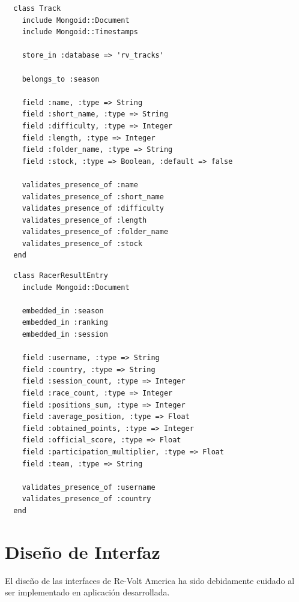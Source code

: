 \begin{listing}
  \begin{verbatim}
  class Track
    include Mongoid::Document
    include Mongoid::Timestamps
    
    store_in :database => 'rv_tracks'
    
    belongs_to :season
    
    field :name, :type => String
    field :short_name, :type => String
    field :difficulty, :type => Integer
    field :length, :type => Integer
    field :folder_name, :type => String
    field :stock, :type => Boolean, :default => false
    
    validates_presence_of :name
    validates_presence_of :short_name
    validates_presence_of :difficulty
    validates_presence_of :length
    validates_presence_of :folder_name
    validates_presence_of :stock
  end
  \end{verbatim}
\end{listing}

\begin{listing}
  \begin{verbatim}
  class RacerResultEntry
    include Mongoid::Document
    
    embedded_in :season
    embedded_in :ranking
    embedded_in :session
    
    field :username, :type => String
    field :country, :type => String
    field :session_count, :type => Integer
    field :race_count, :type => Integer
    field :positions_sum, :type => Integer
    field :average_position, :type => Float
    field :obtained_points, :type => Integer
    field :official_score, :type => Float
    field :participation_multiplier, :type => Float
    field :team, :type => String
    
    validates_presence_of :username
    validates_presence_of :country
  end
  \end{verbatim}
\end{listing}

\clearpage

\section{Diseño de Interfaz}
El diseño de las interfaces de Re-Volt America ha sido debidamente cuidado al ser implementado en aplicación desarrollada.

